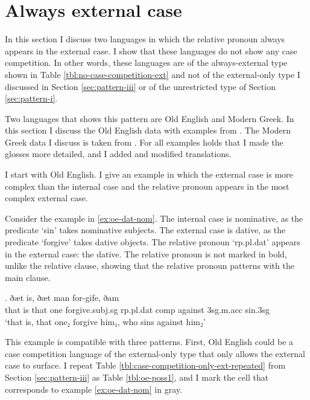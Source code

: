 \section{Always external case}\label{sec:always-ext}

In this section I discuss two languages in which the relative pronoun always appears in the external case. I show that these languages do not show any case competition. In other words, these languages are of the always-external type shown in Table \ref{tbl:no-case-competition-ext} and not of the external-only type I discussed in Section \ref{sec:pattern-iii} or of the unrestricted type of Section \ref{sec:pattern-i}.

Two languages that shows this pattern are Old English and Modern Greek. In this section I discuss the Old English data with examples from \citet{harbert1983}. The Modern Greek data I discuss is taken from \citet{daskalaki2011}. For all examples holds that I made the glosses more detailed, and I added and modified translations.

I start with Old English. I give an example in which the external case is more complex than the internal case and the relative pronoun appears in the most complex external case.

Consider the example in \ref{ex:oe-dat-nom}.
The internal case is nominative, as the predicate  `sin' takes nominative subjects.
The external case is dative, as the predicate  `forgive' takes dative objects.
The relative pronoun  `\ac{rp}.\ac{pl}.\ac{dat}' appears in the external case: the dative. The relative pronoun is not marked in bold, unlike the relative clause, showing that the relative pronoun patterns with the main clause.

\exg. ðæt is, ðæt man for-gife, ðam    \\
 that is that one forgive.\ac{subj}.\ac{sg}\scsub{[dat]} \ac{rp}.\ac{pl}.\ac{dat} \ac{comp} against 3\ac{sg}.\ac{m}.\ac{acc} sin.3\ac{sg}\scsub{[nom]}\\
 `that is, that one₂ forgive him₁, who sins against him₂'  \label{ex:oe-dat-nom}

This example is compatible with three patterns. First, Old English could be a case competition language of the external-only type that only allows the external case to surface. I repeat Table \ref{tbl:case-competition-only-ext-repeated} from Section \ref{sec:pattern-iii} as Table \ref{tbl:oe-poss1}, and I mark the cell that corresponds to example \ref{ex:oe-dat-nom} in gray.

